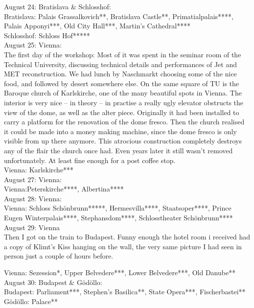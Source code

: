 August 24: Bratislava \& Schlosshof:\\
Bratislava: Palais Grassalkovich**, Bratislava Castle**, Primatialpalais****, Palais Apponyi***, Old City Hall***, Martin's Cathedral****\\
Schlosshof: Schloss Hof*****\\

August 25: Vienna:\\
The first day of the workshop: Most of it was spent in the seminar room of the Technical University, discussing technical details and performances of Jet and MET reconstruction. We had lunch by Naschmarkt choosing some of the nice food, and followed by desert somewhere else. On the same square of TU is the Baroque church of Karlskirche, one of the many beautiful spots in Vienna. The interior is very nice -- in theory -- in practise a really ugly elevator obstructs the view of the dome, as well as the alter piece. Originally it had been installed to carry a platform for the renovation of the dome fresco. Then the church realised it could be made into a money making machine, since the dome fresco is only visible from up there anymore. This atrocious construction completely destroys any of the flair the church once had. Even years later it still wasn't removed unfortunately. At least fine enough for a post coffee stop.\\

Vienna: Karlskirche***\\

August 27: Vienna:\\

Vienna:Peterskirche****, Albertina****\\

August 28: Vienna:\\
Vienna: Schloss Sch\"onbrunn*****, Hermesvilla****, Staatsoper****, Prince Eugen Winterpalais****, Stephansdom****, Schlosstheater Sch\"onbrunn****\\

August 29: Vienna\\
Then I got on the train to Budapest. Funny enough the hotel room i received had a copy of Klimt's Kiss hanging on the wall, the very same picture I had seen in person just a couple of hours before.

Vienna: Sezession*, Upper Belvedere***, Lower Belvedere***, Old Danube**\\

August 30: Budapest \& G\"od\"ollo:\\
Budapest: Parliament***, Stephen's Basilica**, State Opera***, Fischerbastei**\\
G\"od\"ollo: Palace**\\

